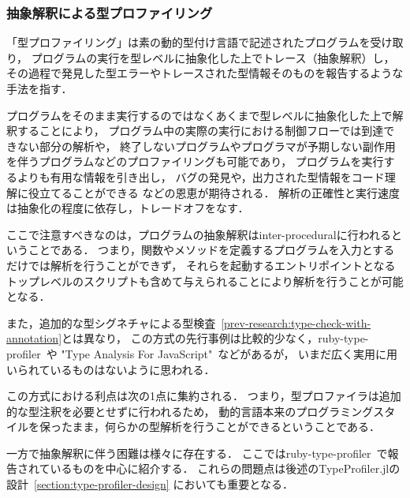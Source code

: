 \subsubsection{抽象解釈による型プロファイリング} \label{prev-research:type-profiling}

「型プロファイリング」は素の動的型付け言語で記述されたプログラムを受け取り，
プログラムの実行を型レベルに抽象化した上でトレース（抽象解釈）し，
その過程で発見した型エラーやトレースされた型情報そのものを報告するような手法を指す．

プログラムをそのまま実行するのではなくあくまで型レベルに抽象化した上で解釈することにより，
プログラム中の実際の実行における制御フローでは到達できない部分の解析や，
終了しないプログラムやプログラマが予期しない副作用を伴うプログラムなどのプロファイリングも可能であり，
プログラムを実行するよりも有用な情報を引き出し，
バグの発見や，出力された型情報をコード理解に役立てることができる
などの恩恵が期待される\footnotemark[\value{footnote}]．
解析の正確性と実行速度は抽象化の程度に依存し，トレードオフをなす．

ここで注意すべきなのは，プログラムの抽象解釈はinter-proceduralに行われるということである．
つまり，関数やメソッドを定義するプログラムを入力とするだけでは解析を行うことができず，
それらを起動するエントリポイントとなるトップレベルのスクリプトも含めて与えられることにより解析を行うことが可能となる．

また，追加的な型シグネチャによる型検査~\ref{prev-research:type-check-with-annotation}とは異なり，
この方式の先行事例は比較的少なく，ruby-type-profiler~\cite{ruby-type-profiler}や
"Type Analysis For JavaScript"~\cite{type-analysis-for-javascript}などがあるが，
いまだ広く実用に用いられているものはないように思われる．\

この方式における利点は次の1点に集約される．
つまり，型プロファイラは追加的な型注釈を必要とせずに行われるため，
動的言語本来のプログラミングスタイルを保ったまま，何らかの型解析を行うことができるということである．

一方で抽象解釈に伴う困難は様々に存在する．
ここではruby-type-profiler~\cite{ruby-progress-report, ruby-type-profiler}で報告されているものを中心に紹介する．
これらの問題点は後述のTypeProfiler.jlの設計~\ref{section:type-profiler-design}
においても重要となる．

